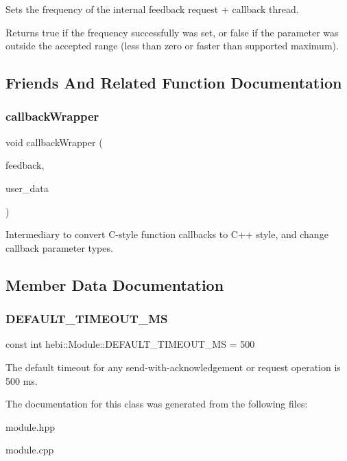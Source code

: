 Sets the frequency of the internal feedback request + callback thread. 

\begin{DoxyReturn}{Returns}
{\ttfamily true} if the frequency successfully was set, or {\ttfamily false} if the parameter was outside the accepted range (less than zero or faster than supported maximum). 
\end{DoxyReturn}


\subsection{Friends And Related Function Documentation}
\mbox{\label{classhebi_1_1Module_ad4fe704ddfe93cfcff2d81388c2693c5}} 
\subsubsection{\texorpdfstring{callback\+Wrapper}{callbackWrapper}}
{\footnotesize\ttfamily void callback\+Wrapper (\begin{DoxyParamCaption}\item[{Hebi\+Feedback\+Ptr}]{feedback,  }\item[{void $\ast$}]{user\+\_\+data }\end{DoxyParamCaption})\hspace{0.3cm}{\ttfamily [friend]}}

Intermediary to convert C-\/style function callbacks to C++ style, and change callback parameter types. 

\subsection{Member Data Documentation}
\mbox{\label{classhebi_1_1Module_afba0d28ff83c8ddabd8f6490e412c821}} 
\subsubsection{\texorpdfstring{D\+E\+F\+A\+U\+L\+T\+\_\+\+T\+I\+M\+E\+O\+U\+T\+\_\+\+MS}{DEFAULT\_TIMEOUT\_MS}}
{\footnotesize\ttfamily const int hebi\+::\+Module\+::\+D\+E\+F\+A\+U\+L\+T\+\_\+\+T\+I\+M\+E\+O\+U\+T\+\_\+\+MS = 500\hspace{0.3cm}{\ttfamily [static]}}

The default timeout for any send-\/with-\/acknowledgement or request operation is 500 ms. 

The documentation for this class was generated from the following files\+:\begin{DoxyCompactItemize}
\item 
module.\+hpp\item 
module.\+cpp\end{DoxyCompactItemize}
